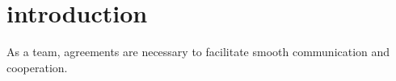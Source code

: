 \section{introduction}
As a team, agreements are necessary to facilitate smooth communication and cooperation.